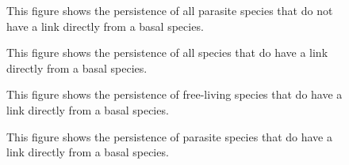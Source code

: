 \documentclass[11pt]{amsart}
\begin{document}
\begin{figure}[h]
\caption{This figure shows the persistence of all parasite species that do not have a link directly from a basal species.\label{tl3-para}}
\end{figure}

\begin{figure}[h]
\caption{This figure shows the persistence of all species that do have a link directly from a basal species.\label{tl2-all}}
\end{figure}

\begin{figure}[h]
\caption{This figure shows the persistence of free-living species that do have a link directly from a basal species.\label{tl2-free}}
\end{figure}

\begin{figure}[h]
\caption{This figure shows the persistence of parasite species that do have a link directly from a basal species.\label{tl2-para}}
\end{figure}


\newpage



\newpage
\end{document}
